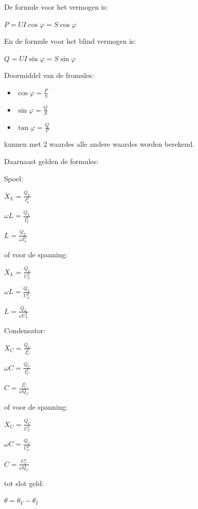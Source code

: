 De formule voor het vermogen is:

$P= UI \cos \varphi=S \cos \varphi$

\vspace{5mm}

En de formule voor het blind vermogen is:

$Q= UI \sin \varphi=S \sin \varphi$

\vspace{5mm}

Doormiddel van de fromules:
\begin{itemize}
    \item $\cos \varphi =\frac{P}{S}$
    \item $\sin \varphi =\frac{Q}{S}$
    \item $\tan \varphi =\frac{Q}{P}$
\end{itemize}

kunnen met 2 waardes alle andere waardes worden berekend.

Daarnaast gelden de formules:

Spoel:

$X_L=\frac{Q_L}{I_L^2}$

$\omega L=\frac{Q_L}{I_L^2}$

$L=\frac{Q_L}{\omega I_L^2}$

\vspace{5mm}

of voor de spanning:

$X_L=\frac{Q_L}{U_L^2}$

$\omega L=\frac{Q_L}{U_L^2}$

$L=\frac{Q_L}{\omega U_L^2}$

\vspace{5mm}

Condensator:

$X_C=\frac{Q_C}{I_C^2}$

$\omega C=\frac{Q_C}{I_C^2}$

$C=\frac{I_C^2}{\omega Q_C}$

\vspace{5mm}

of voor de spanning:

$X_C=\frac{Q_C}{U_C^2}$

$\omega C=\frac{Q_C}{U_C^2}$

$C=\frac{U_C^2}{\omega Q_C}$

\vspace{5mm}

tot slot geld: 

$\theta = \theta _V - \theta _I$

